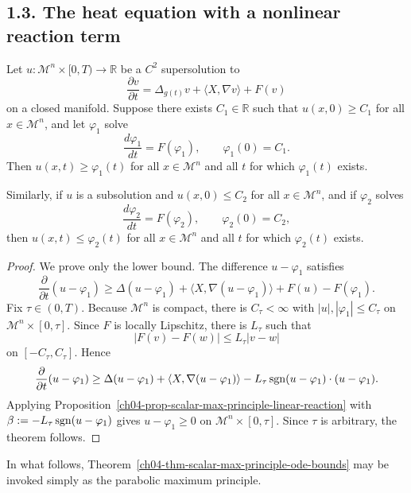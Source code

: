 \subsection*{1.3. The heat equation with a nonlinear reaction term}

\begin{theorem}
\label{ch04-thm-scalar-max-principle-ode-bounds}
Let \(u : \mathcal M^n \times [0,T) \to \mathbb R\) be a \(C^2\) supersolution to
\[
\frac{\partial v}{\partial t} = \Delta_{g(t)} v + \langle X, \nabla v \rangle + F(v)
\]
on a closed manifold. Suppose there exists \(C_1 \in \mathbb R\) such that \(u(x,0)\ge C_1\) for all \(x \in \mathcal M^n\), and let \(\varphi_1\) solve
\[
\frac{d\varphi_1}{dt}=F(\varphi_1),\qquad \varphi_1(0)=C_1.
\]
Then \(u(x,t)\ge \varphi_1(t)\) for all \(x \in \mathcal M^n\) and all \(t\) for which \(\varphi_1(t)\) exists.

Similarly, if \(u\) is a subsolution and \(u(x,0)\le C_2\) for all \(x \in \mathcal M^n\), and if \(\varphi_2\) solves
\[
\frac{d\varphi_2}{dt}=F(\varphi_2),\qquad \varphi_2(0)=C_2,
\]
then \(u(x,t)\le \varphi_2(t)\) for all \(x \in \mathcal M^n\) and all \(t\) for which \(\varphi_2(t)\) exists.
\end{theorem}

\begin{proof}
We prove only the lower bound. The difference \(u-\varphi_1\) satisfies
\[
\frac{\partial}{\partial t}(u-\varphi_1)\ge \Delta(u-\varphi_1)+\langle X,\nabla(u-\varphi_1)\rangle+F(u)-F(\varphi_1).
\]
Fix \(\tau\in(0,T)\). Because \(\mathcal M^n\) is compact, there is \(C_\tau<\infty\) with \(|u|,|\varphi_1|\le C_\tau\) on \(\mathcal M^n\times[0,\tau]\). Since \(F\) is locally Lipschitz, there is \(L_\tau\) such that
\[
|F(v)-F(w)|\le L_\tau |v-w|
\]
on \([-C_\tau,C_\tau]\). Hence
\[
\frac{\partial}{\partial t}(u-\varphi_1)\ge \Delta(u-\varphi_1)+\langle X,\nabla(u-\varphi_1)\rangle -L_\tau \operatorname{sgn}(u-\varphi_1)\cdot(u-\varphi_1).
\]
Applying Proposition~\ref{ch04-prop-scalar-max-principle-linear-reaction} with \(\beta:=-L_\tau\operatorname{sgn}(u-\varphi_1)\) gives \(u-\varphi_1\ge 0\) on \(\mathcal M^n\times[0,\tau]\). Since \(\tau\) is arbitrary, the theorem follows.
\end{proof}

\begin{remark}
\label{ch04-rem-use-parabolic-maximum-principle}
In what follows, Theorem~\ref{ch04-thm-scalar-max-principle-ode-bounds} may be invoked simply as the parabolic maximum principle.
\end{remark}

